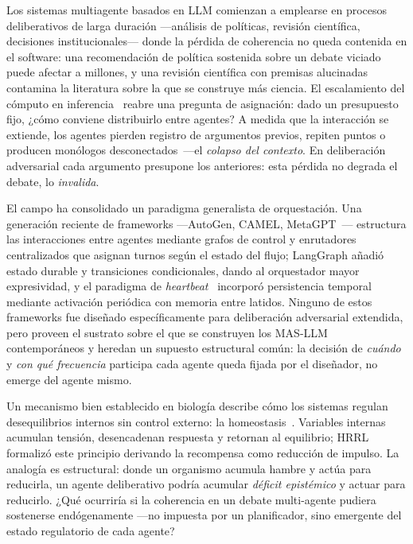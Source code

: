 \documentclass{llncs}
\begin{document}
Los sistemas multiagente basados en LLM comienzan a emplearse en
procesos deliberativos de larga duraci\'on ---an\'alisis de pol\'iticas,
revisi\'on cient\'ifica, decisiones institucionales--- donde la
p\'erdida de coherencia no queda contenida en el software: una
recomendaci\'on de pol\'itica sostenida sobre un debate viciado puede
afectar a millones, y una revisi\'on cient\'ifica con premisas
alucinadas contamina la literatura sobre la que se construye m\'as
ciencia. El escalamiento del c\'omputo en
inferencia~\parencite{snell2024scaling} reabre una pregunta de
asignaci\'on: dado un presupuesto fijo, ¿c\'omo conviene distribuirlo
entre agentes? A medida que la interacci\'on se extiende, los agentes
pierden registro de argumentos previos, repiten puntos o producen
mon\'ologos desconectados~\parencite{park2023generative}---el
\emph{colapso del contexto}. En deliberaci\'on adversarial cada
argumento presupone los anteriores: esta p\'erdida no degrada el
debate, lo \emph{invalida}.

El campo ha consolidado un paradigma generalista de orquestaci\'on. Una
generaci\'on reciente de frameworks ---AutoGen, CAMEL,
MetaGPT~\parencite{wu2023autogen,li2023camel,hong2023metagpt}--- estructura
las interacciones entre agentes mediante grafos de control y enrutadores
centralizados que asignan turnos seg\'un el estado del flujo;
LangGraph a\~nadi\'o estado durable y transiciones condicionales, dando al
orquestador mayor expresividad, y el paradigma de
\emph{heartbeat}~\parencite{openclaw2025heartbeat} incorpor\'o
persistencia temporal mediante activaci\'on peri\'odica con memoria entre
latidos. Ninguno de estos frameworks fue dise\~nado espec\'ificamente para
deliberaci\'on adversarial extendida, pero proveen el sustrato sobre el
que se construyen los MAS-LLM contempor\'aneos y heredan un supuesto
estructural com\'un: la decisi\'on de \emph{cu\'ando} y \emph{con qu\'e
frecuencia} participa cada agente queda fijada por el dise\~nador, no
emerge del agente mismo.

Un mecanismo bien establecido en biolog\'ia describe c\'omo los sistemas
regulan desequilibrios internos sin control externo: la
homeostasis~\parencite{sterling1988allostasis}. Variables internas
acumulan tensi\'on, desencadenan respuesta y retornan al equilibrio;
HRRL~\parencite{keramati2014homeostatic} formaliz\'o este principio
derivando la recompensa como reducci\'on de impulso. La analog\'ia es
estructural: donde un organismo acumula hambre y act\'ua para reducirla,
un agente deliberativo podr\'ia acumular \emph{d\'eficit epist\'emico} y
actuar para reducirlo. ¿Qu\'e ocurrir\'ia si la coherencia en un debate
multi-agente pudiera sostenerse end\'ogenamente ---no impuesta por un
planificador, sino emergente del estado regulatorio de cada agente?
\end{document}
